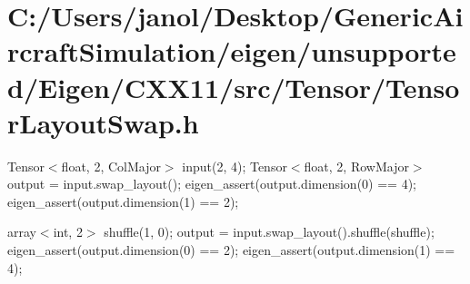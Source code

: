 \hypertarget{_c_1_2_users_2janol_2_desktop_2_generic_aircraft_simulation_2eigen_2unsupported_2_eigen_2_c_x_x1995ff76eaccdd7a9ea13b307626fb9df}{}\section{C\+:/\+Users/janol/\+Desktop/\+Generic\+Aircraft\+Simulation/eigen/unsupported/\+Eigen/\+C\+X\+X11/src/\+Tensor/\+Tensor\+Layout\+Swap.\+h}
Tensor$<$float, 2, Col\+Major$>$ input(2, 4); Tensor$<$float, 2, Row\+Major$>$ output = input.\+swap\+\_\+layout(); eigen\+\_\+assert(output.\+dimension(0) == 4); eigen\+\_\+assert(output.\+dimension(1) == 2);

array$<$int, 2$>$ shuffle(1, 0); output = input.\+swap\+\_\+layout().shuffle(shuffle); eigen\+\_\+assert(output.\+dimension(0) == 2); eigen\+\_\+assert(output.\+dimension(1) == 4);



